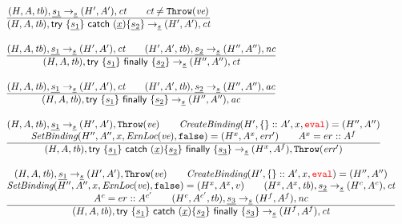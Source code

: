 \[\begin{array}{l@{~~}l@{~~}ll}
\frac{\begin{matrix}
\statel, \ir{\stmt_1} \rightarrow_{\ir\stmt} \resp, \ct
\rulesep
\ct \not= {\tt Throw}(\emph{ve})
\end{matrix}}{\begin{matrix}
\state, \irtrycat \rightarrow_{\ir\stmt} \resp, \ct
\end{matrix}}
\\[2em]


\frac{\begin{matrix}
\statel, \ir{\stmt_1} \rightarrow_{\ir\stmt} \resp, \ct
\rulesep
\statepl, \ir{\stmt_2} \rightarrow_{\ir\stmt} \respp, \nc
\end{matrix}}{\begin{matrix}
\state, \irtryfin \rightarrow_{\ir\stmt}  \respp, \ct
\end{matrix}}
\\[2em]

\frac{\begin{matrix}
\statel, \ir{\stmt_1} \rightarrow_{\ir\stmt} \resp, \ct
\rulesep
\statepl, \ir{\stmt_2} \rightarrow_{\ir\stmt} \respp, \ac
\end{matrix}}{\begin{matrix}
\state, \irtryfin \rightarrow_{\ir\stmt} \respp, \ac
\end{matrix}}
\\[2em]

\frac{\begin{matrix}
\statel, \ir{\stmt_1} \rightarrow_{\ir\stmt} \resp, {\tt Throw}(\emph{ve})
\rulesep
\hf{CreateBinding}(H',\{\}::A',x,\eval)=\respp
\\
\hf{SetBinding}(H'', A'', x, \hf{ExnLoc}(\emph{ve}), \false) = (H^x, A^x, \err')
\rulesep
A^x = er::A^f
\end{matrix}}{\begin{matrix}
\state, \irtrycatfin \rightarrow_{\ir\stmt} (H^x,A^f), {\tt Throw}(\err')
\end{matrix}}
\\[2em]

\frac{\begin{matrix}
\statel, \ir{\stmt_1} \rightarrow_{\ir\stmt} \resp, {\tt Throw}(\emph{ve})
\rulesep
\hf{CreateBinding}(H',\{\}::A',x,\eval)=\respp
\\
\hf{SetBinding}(H'', A'', x, \hf{ExnLoc}(\emph{ve}), \false) = (H^x, A^x, v)
\rulesep
(H^x,A^x,\tb), \ir{\stmt_2} \rightarrow_{\ir\stmt} (H^c,A^c), \ct
\\
A^c = er::A^{c'}
\rulesep
(H^c, A^{c'}, tb), \ir{\stmt_3} \rightarrow_{\ir\stmt} (H^f, A^f), \nc
\end{matrix}}{\begin{matrix}
\state, \irtrycatfin \rightarrow_{\ir\stmt} (H^f,A^f), \ct
\end{matrix}}
\\[2em]


\end{array}\]
